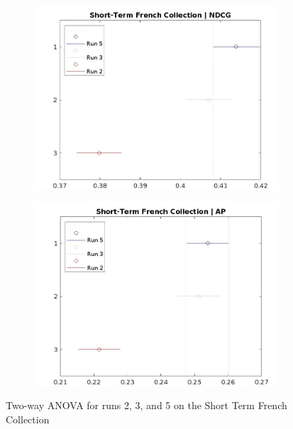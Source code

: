 \begin{figure}[!h]
    \centering
    \begin{subfigure}[b]{0.49\textwidth}
        \centering
        \includegraphics[width=\textwidth]{figure/StatisticalAnalysis/ANOVA 2/ndcg-st-fr.jpeg}
        \label{fig:st_anova_french_ndcg}        
    \end{subfigure}
    \hfill
    \begin{subfigure}[b]{0.49\textwidth}
        \centering
        \includegraphics[width=\textwidth]{figure/StatisticalAnalysis/ANOVA 2/ap-st-fr.jpeg}
        \label{fig:st_anova_french_ap}
    \end{subfigure}
    \caption{Two-way \ac{ANOVA} for runs 2, 3, and 5 on the Short Term French Collection}
    \label{fig:st_anova_french}
\end{figure}


